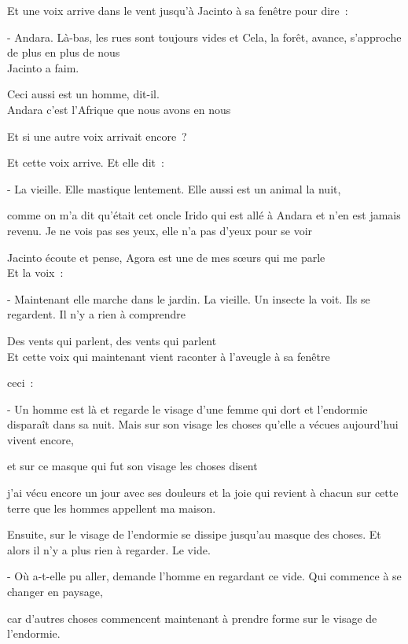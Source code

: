 Et une voix arrive dans le vent jusqu'à Jacinto à sa fenêtre pour dire~:

- Andara. Là-bas, les rues sont toujours vides et Cela, la forêt,
avance, s'approche de plus en plus de nous\\

Jacinto a faim.

Ceci aussi est un homme, dit-il.\\

Andara c'est l'Afrique que nous avons en nous

\pagebreak

Et si une autre voix arrivait encore~?

Et cette voix arrive. Et elle dit~:

- La vieille. Elle mastique lentement. Elle aussi est un animal la nuit,

comme on m'a dit qu'était cet oncle Irido qui est allé à Andara et n'en
est jamais revenu. Je ne vois pas ses yeux, elle n'a pas d'yeux pour se
voir

Jacinto écoute et pense, Agora est une de mes sœurs qui me parle\\	

Et la voix~:

- Maintenant elle marche dans le jardin. La vieille. Un insecte la voit.
Ils se regardent. Il n'y a rien à comprendre

\pagebreak

Des vents qui parlent, des vents qui parlent\\

Et cette voix qui maintenant vient raconter à l'aveugle à sa fenêtre

ceci~:

- Un homme est là et regarde le visage d'une femme qui dort et
l'endormie disparaît dans sa nuit. Mais sur son visage les choses
qu'elle a vécues aujourd'hui vivent encore,

et sur ce masque qui fut son visage les choses disent

j'ai vécu encore un jour avec ses douleurs et la joie qui revient à
chacun sur cette terre que les hommes appellent ma maison.

Ensuite, sur le visage de l'endormie se dissipe jusqu'au masque des
choses. Et alors il n'y a plus rien à regarder. Le vide.

- Où a-t-elle pu aller, demande l'homme en regardant ce vide. Qui
commence à se changer en paysage,

car d'autres choses commencent maintenant à prendre forme sur le visage
de l'endormie.

